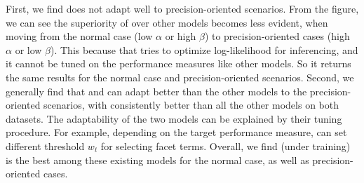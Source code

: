 First, we find \QFJ does not adapt well to precision-oriented scenarios. From the figure, we can see the superiority of \QFJ over other models becomes less evident, when moving from the normal case (low $\alpha$ or high $\beta$) to precision-oriented cases (high $\alpha$ or low $\beta$). This because that \QFJ tries to optimize log-likelihood for inferencing, and it cannot be tuned on the performance measures like other models. So it returns the same results for the normal case and precision-oriented scenarios. Second, we generally find that \QFI and \QDM can adapt better than the other models to the precision-oriented scenarios, with \QFI consistently better than all the other models on both datasets. The adaptability of the two models can be explained by their tuning procedure. For example, depending on the target performance measure, \QFI can set different threshold $w_t$ for selecting facet terms. Overall, we find \QFI (under \MLE training) is the best among these existing models for the normal case, as well as precision-oriented cases.
 
